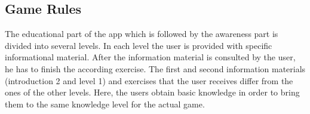 \subsection{Game Rules}
\label{s:game_rules}
The educational part of the app which is followed by the awareness part is divided into several levels.
 In each level the user is provided with specific informational material.
 After the information material is consulted by the user, he has to finish the according exercise.
The first  and second information materials (introduction 2 and level 1) and exercises that the user receives differ from the ones of the other levels. Here, the users obtain basic knowledge in order to bring them to the same knowledge level for the actual game.
 
